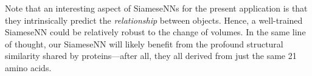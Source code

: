 Note that an interesting aspect of SiameseNNs for the present application is that they intrinsically predict the \textit{relationship} between objects.
Hence, a well-trained SiameseNN could be relatively robust to the change of volumes.
In the same line of thought, our SiameseNN will likely benefit from the profound structural similarity shared by proteins---after all, they all derived from just the same 21 amino acids.
